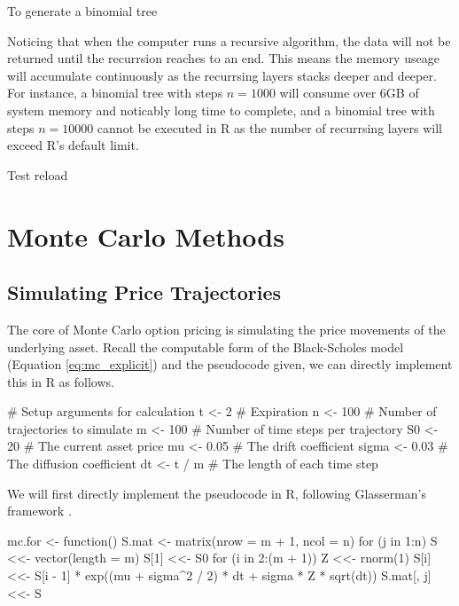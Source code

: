 To generate a binomial tree





Noticing that when the computer runs a recursive algorithm, the data will not be returned until the recurrsion reaches to an end. This means the memory useage will accumulate continuously as the recurrsing layers stacks deeper and deeper. For instance, a binomial tree with steps $n=1000$ will consume over 6GB of system memory and noticably long time to complete, and a binomial tree with steps $n=10000$ cannot be executed in R as the number of recurrsing layers will exceed R's default limit.

Test reload


\section{Monte Carlo Methods}

\subsection{Simulating Price Trajectories}

The core of Monte Carlo option pricing is simulating the price movements of the underlying asset. Recall the computable form of the Black-Scholes model (Equation \ref{eq:mc_explicit}) and the pseudocode given, we can directly implement this in R as follows.

\begin{Rminted}
# Setup arguments for calculation
t <- 2 # Expiration
n <- 100 # Number of trajectories to simulate
m <- 100 # Number of time steps per trajectory
S0 <- 20 # The current asset price
mu <- 0.05 # The drift coefficient
sigma <- 0.03 # The diffusion coefficient
dt <- t / m # The length of each time step
\end{Rminted}

We will first directly implement the pseudocode in R, following Glasserman's framework \cite{Glasserman2003}.

\begin{Rminted}
mc.for <- function() {
    S.mat <- matrix(nrow = m + 1, ncol = n)
    for (j in 1:n) {
        S <<- vector(length = m)
        S[1] <<- S0
        for (i in 2:(m + 1)) {
            Z <<- rnorm(1)
            S[i] <<- S[i - 1] * exp((mu + sigma^2 / 2) * dt + sigma * Z * sqrt(dt))
        }
        S.mat[, j] <<- S
    }
}
\end{Rminted}

